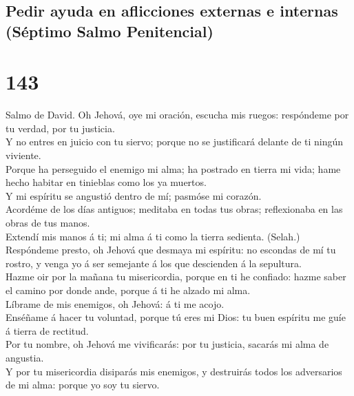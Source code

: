 \hypertarget{pedir-ayuda-en-aflicciones-externas-e-internas-suxe9ptimo-salmo-penitencial}{%
\subsection{Pedir ayuda en aflicciones externas e internas (Séptimo
Salmo
Penitencial)}\label{pedir-ayuda-en-aflicciones-externas-e-internas-suxe9ptimo-salmo-penitencial}}

\hypertarget{section-142}{%
\section{143}\label{section-142}}

 Salmo de David. Oh Jehová, oye mi oración, escucha mis
ruegos: respóndeme por tu verdad, por tu justicia.\\
 Y no entres en juicio con tu siervo; porque no se
justificará delante de ti ningún viviente.\\
 Porque ha perseguido el enemigo mi alma; ha postrado en
tierra mi vida; hame hecho habitar en tinieblas como los ya muertos.\\
 Y mi espíritu se angustió dentro de mí; pasmóse mi
corazón.\\
 Acordéme de los días antiguos; meditaba en todas tus
obras; reflexionaba en las obras de tus manos.\\
 Extendí mis manos á ti; mi alma á ti como la tierra
sedienta. (Selah.)\\
 Respóndeme presto, oh Jehová que desmaya mi espíritu: no
escondas de mí tu rostro, y venga yo á ser semejante á los que
descienden á la sepultura.\\
 Hazme oir por la mañana tu misericordia, porque en ti he
confiado: hazme saber el camino por donde ande, porque á ti he alzado mi
alma.\\
 Líbrame de mis enemigos, oh Jehová: á ti me acojo.\\
 Enséñame á hacer tu voluntad, porque tú eres mi Dios: tu
buen espíritu me guíe á tierra de rectitud.\\
 Por tu nombre, oh Jehová me vivificarás: por tu
justicia, sacarás mi alma de angustia.\\
 Y por tu misericordia disiparás mis enemigos, y
destruirás todos los adversarios de mi alma: porque yo soy tu siervo.


